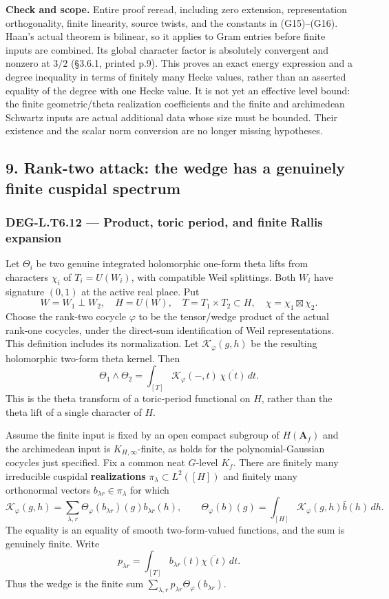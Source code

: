 \textbf{Check and scope.} Entire proof reread, including zero extension, representation orthogonality, finite linearity, source twists, and the constants in (G15)--(G16). Haan's actual theorem is bilinear, so it applies to Gram entries before finite inputs are combined. Its global character factor is absolutely convergent and nonzero at \(3/2\) (§3.6.1, printed p.9). This proves an exact energy expression and a degree inequality in terms of finitely many Hecke values, rather than an asserted equality of the degree with one Hecke value. It is not yet an effective level bound: the finite geometric/theta realization coefficients and the finite and archimedean Schwartz inputs are actual additional data whose size must be bounded. Their existence and the scalar norm conversion are no longer missing hypotheses.

\subsection{9. Rank-two attack: the wedge has a genuinely finite cuspidal spectrum}\label{rank-two-attack-the-wedge-has-a-genuinely-finite-cuspidal-spectrum}

\subsubsection{DEG-L.T6.12 --- Product, toric period, and finite Rallis expansion}\label{DEG-L.T6.12}

Let \(\Theta_i\) be two genuine integrated holomorphic one-form theta lifts from characters \(\chi_i\) of \(T_i=U(W_i)\), with compatible Weil splittings. Both \(W_i\) have signature \((0,1)\) at the active real place. Put \[
W=W_1\perp W_2,\quad H=U(W),\quad T=T_1\times T_2\subset H,\quad \chi=\chi_1\boxtimes\chi_2.
\] Choose the rank-two cocycle \(\varphi\) to be the tensor/wedge product of the actual rank-one cocycles, under the direct-sum identification of Weil representations. This definition includes its normalization. Let \(\mathcal K_\varphi(g,h)\) be the resulting holomorphic two-form theta kernel. Then \[
\Theta_1\wedge\Theta_2
=\int_{[T]}\mathcal K_\varphi(-,t)\,\overline{\chi(t)}\,dt.
\tag{G17}
\] This is the theta transform of a toric-period functional on \(H\), rather than the theta lift of a single character of \(H\).

Assume the finite input is fixed by an open compact subgroup of \(H(\mathbf A_f)\) and the archimedean input is \(K_{H,\infty}\)-finite, as holds for the polynomial-Gaussian cocycles just specified. Fix a common neat \(G\)-level \(K_f\). There are finitely many irreducible cuspidal \textbf{realizations} \(\pi_\lambda\subset L^2([H])\) and finitely many orthonormal vectors \(b_{\lambda r}\in\pi_\lambda\) for which \[
\mathcal K_\varphi(g,h)=
\sum_{\lambda,r}\Theta_\varphi(b_{\lambda r})(g)b_{\lambda r}(h),
\qquad
\Theta_\varphi(b)(g)=\int_{[H]}\mathcal K_\varphi(g,h)\bar b(h)\,dh.
\tag{G18}
\] The equality is an equality of smooth two-form-valued functions, and the sum is genuinely finite. Write \[
p_{\lambda r}=\int_{[T]}b_{\lambda r}(t)\overline{\chi(t)}\,dt.
\] Thus the wedge is the finite sum \(\sum_{\lambda,r}p_{\lambda r}\Theta_\varphi(b_{\lambda r})\).

